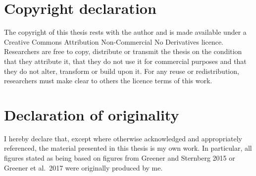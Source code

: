 \chapter*{Copyright declaration}

The copyright of this thesis rests with the author and is made available under a Creative Commons Attribution Non-Commercial No Derivatives licence.
Researchers are free to copy, distribute or transmit the thesis on the condition that they attribute it, that they do not use it for commercial purposes and that they do not alter, transform or build upon it.
For any reuse or redistribution, researchers must make clear to others the licence terms of this work.


{\let\clearpage\relax \chapter*{Declaration of originality}}

I hereby declare that, except where otherwise acknowledged and appropriately referenced, the material presented in this thesis is my own work.
In particular, all figures stated as being based on figures from Greener and Sternberg 2015 or Greener et al.\ 2017 were originally produced by me. 
